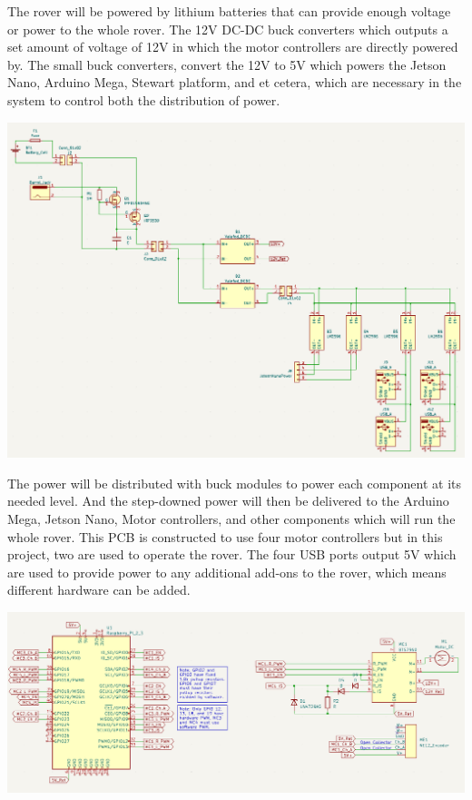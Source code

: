 \documentclass[a4paper, 10pt]{article}
\begin{document}
		The rover will be powered by lithium batteries that can provide enough voltage or power to the whole rover. The 12V DC-DC buck converters which outputs a set amount of voltage of 12V in which the motor controllers are directly powered by. The small buck converters, convert the 12V to 5V which powers the Jetson Nano, Arduino Mega, Stewart platform, and et cetera, which are necessary in the system to control both the distribution of power. 
		
		\includegraphics[scale=1.05]{Photos/Rover schematic 1}

		The power will be distributed with buck modules to power each component at its needed level. And the step-downed power will then be delivered to the Arduino Mega, Jetson Nano, Motor controllers, and other components which will run the whole rover. This PCB is constructed to use four motor controllers but in this project, two are used to operate the rover. The four USB ports output 5V which are used to provide power to any additional add-ons to the rover, which means different hardware can be added. 
		
		\includegraphics[scale=0.95]{Photos/Rover schematic 2}	
		
\end{document}
